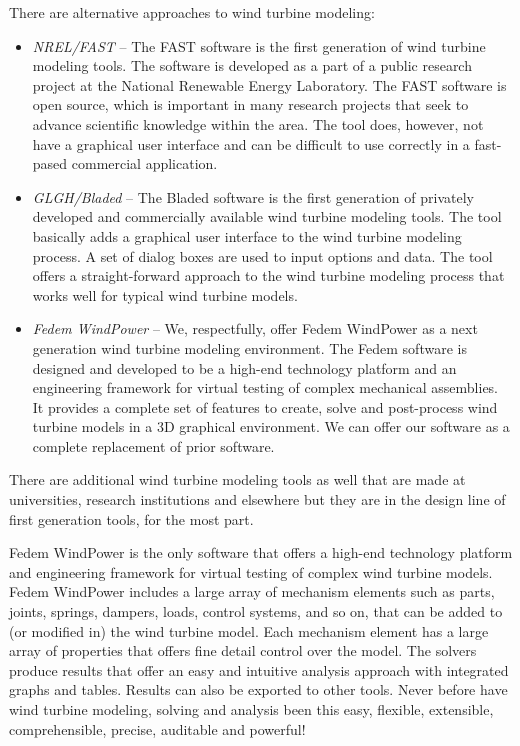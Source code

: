 %
%


There are alternative approaches to wind turbine modeling:

\begin{itemize}
\item{\sl NREL/FAST} --
  The FAST software is the first generation of wind turbine modeling tools.
  The software is developed as a part of a public research project at
  the National Renewable Energy Laboratory.
  The FAST software is open source, which is important in many research projects
  that seek to advance scientific knowledge within the area.
  The tool does, however, not have a graphical user interface and can be
  difficult to use correctly in a fast-pased commercial application.
\item{\sl GLGH/Bladed} --
  The Bladed software is the first generation of privately developed and
  commercially available wind turbine modeling tools.
  The tool basically adds a graphical user interface to the wind
  turbine modeling process. A set of dialog boxes are used to input
  options and data. The tool offers a straight-forward approach to the
  wind turbine modeling process that works well for typical wind turbine models.
\item{\sl Fedem WindPower} --
  We, respectfully, offer Fedem WindPower as a next generation wind turbine
  modeling environment. The Fedem software is designed and developed to be
  a high-end technology platform and an engineering framework for virtual
  testing of complex mechanical assemblies. It provides a complete set of
  features to create, solve and post-process wind turbine models in a
  3D graphical environment.
  We can offer our software as a complete replacement of prior software.
\end{itemize}

There are additional wind turbine modeling tools as well that are made
at universities, research institutions and elsewhere but they are in the
design line of first generation tools, for the most part.

Fedem WindPower is the only software that offers a high-end technology platform
and engineering framework for virtual testing of complex wind turbine models.
Fedem WindPower includes a large array of mechanism elements such as parts,
joints, springs, dampers, loads, control systems, and so on,
that can be added to (or modified in) the wind turbine model.
Each mechanism element has a large array of properties that offers fine detail
control over the model. The solvers produce results that offer an easy and
intuitive analysis approach with integrated graphs and tables.
Results can also be exported to other tools.
Never before have wind turbine modeling, solving and analysis been this easy,
flexible, extensible, comprehensible, precise, auditable and powerful!
